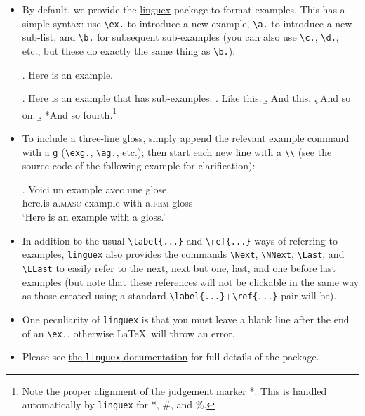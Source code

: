 \documentclass[linguex]{lfg-proc}
\begin{document}
\begin{itemize}
  \item By default, we provide the \href{https://ctan.org/pkg/linguex}{linguex}
        package to format examples. This has a simple syntax: use \verb=\ex.= to
        introduce a new example, \verb=\a.= to introduce a new sub-list, and
        \verb=\b.= for subsequent sub-examples (you can also use \verb=\c.=,
        \verb=\d.=, etc., but these do exactly the same thing as \verb=\b.=):

        \ex. Here is an example.

        \ex. Here is an example that has sub-examples.%
        \a. Like this.%
        \b. And this.%
        \c. And so on.%
        \b. *And so fourth.\footnote{Note the proper alignment of the judgement
        marker *. This is handled automatically by \texttt{linguex} for *, \#,
        and \%.}

  \item To include a three-line gloss, simply append the relevant example
        command with a \verb=g= (\verb=\exg.=, \verb=\ag.=, etc.); then
        start each new line with a \verb=\\= (see the source code of the
        following example for clarification):

        \exg.%
        Voici un example avec une glose.\\
        here.is a.\textsc{masc} example with a.\textsc{fem} gloss\\
        `Here is an example with a gloss.' 

  \item In addition to the usual \verb=\label{...}= and \verb=\ref{...}= ways of
        referring to examples, \verb=linguex= also provides the commands
        \verb=\Next=, \verb=\NNext=, \verb=\Last=, and \verb=\LLast= to easily
        refer to the next, next but one, last, and one before last examples (but
        note that these references will not be clickable in the same way as
        those created using a standard \verb=\label{...}=+\verb=\ref{...}= pair
        will be).

  \item One peculiarity of \verb=linguex= is that you must leave a blank line
        after the end of an \verb=\ex.=, otherwise \LaTeX\ will throw an error.

  \item Please see
        \href{https://ctan.uib.no/macros/latex/contrib/linguex/doc/linguex-doc.pdf}{the
        \texttt{linguex} documentation} for full details of the package.


\end{itemize}
\end{document}
